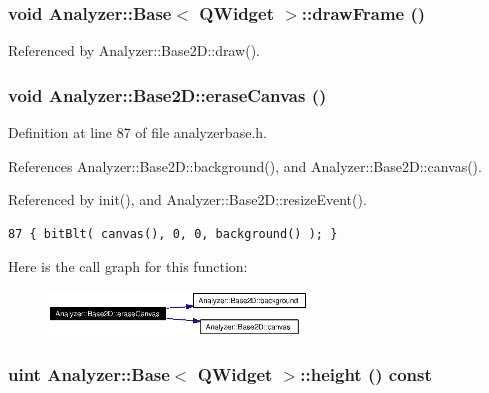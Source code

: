 \subsubsection{\setlength{\rightskip}{0pt plus 5cm}void {\bf Analyzer::Base}$<$ {\bf QWidget}  $>$::draw\-Frame ()\hspace{0.3cm}{\tt  [protected, inherited]}}\label{classAnalyzer_1_1Base_Analyzer_1_1Baseb1}




Referenced by Analyzer::Base2D::draw().
\subsubsection{\setlength{\rightskip}{0pt plus 5cm}void Analyzer::Base2D::erase\-Canvas ()\hspace{0.3cm}{\tt  [inline, protected, inherited]}}\label{classAnalyzer_1_1Base2D_Sonogramb1}




Definition at line 87 of file analyzerbase.h.

References Analyzer::Base2D::background(), and Analyzer::Base2D::canvas().

Referenced by init(), and Analyzer::Base2D::resize\-Event().



\footnotesize\begin{verbatim}87 { bitBlt( canvas(), 0, 0, background() ); }
\end{verbatim}\normalsize 


Here is the call graph for this function:\begin{figure}[H]
\begin{center}
\leavevmode
\includegraphics[width=195pt]{classAnalyzer_1_1Base2D_Sonogramb1_cgraph}
\end{center}
\end{figure}
\subsubsection{\setlength{\rightskip}{0pt plus 5cm}uint {\bf Analyzer::Base}$<$ {\bf QWidget}  $>$::height () const\hspace{0.3cm}{\tt  [inline, inherited]}}\label{classAnalyzer_1_1Base_Analyzer_1_1Basea1}




